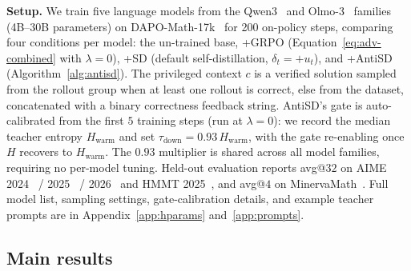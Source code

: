 \documentclass{article}
\begin{document}
\textbf{Setup.} We train five language models from the Qwen3~\citep{yang2025qwen3} and Olmo-3~\citep{olmo2025olmo3} families (4B--30B parameters) on DAPO-Math-17k~\citep{dapo} for 200 on-policy steps, comparing four conditions per model: the un-trained base, +GRPO (Equation~\eqref{eq:adv-combined} with $\lambda=0$), +SD (default self-distillation, $\delta_t = +u_t$), and +AntiSD (Algorithm~\ref{alg:antisd}). The privileged context $c$ is a verified solution sampled from the rollout group when at least one rollout is correct, else from the dataset, concatenated with a binary correctness feedback string. AntiSD's gate is auto-calibrated from the first $5$ training steps (run at $\lambda=0$): we record the median teacher entropy $H_{\mathrm{warm}}$ and set $\tau_{\mathrm{down}} = 0.93\,H_{\mathrm{warm}}$, with the gate re-enabling once $H$ recovers to $H_{\mathrm{warm}}$. The $0.93$ multiplier is shared across all model families, requiring no per-model tuning. Held-out evaluation reports avg@$32$ on AIME 2024~\citep{aime24} / 2025~\citep{aime25} / 2026~\citep{aime26} and HMMT 2025~\citep{dekoninck2026matharena}, and avg@$4$ on MinervaMath~\citep{lewkowycz2022solving}. Full model list, sampling settings, gate-calibration details, and example teacher prompts are in Appendix~\ref{app:hparams} and~\ref{app:prompts}.

\subsection{Main results}
\label{sec:exp:main}
\vspace{-0.5em}


\end{document}
